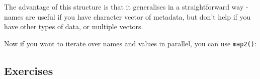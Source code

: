 \documentclass[]{book}
\newenvironment{Shaded}{\begin{snugshade}}{\end{snugshade}}
\newcommand{\KeywordTok}[1]{\textcolor[rgb]{0.13,0.29,0.53}{\textbf{{#1}}}}
\newcommand{\DataTypeTok}[1]{\textcolor[rgb]{0.13,0.29,0.53}{{#1}}}
\newcommand{\DecValTok}[1]{\textcolor[rgb]{0.00,0.00,0.81}{{#1}}}
\newcommand{\StringTok}[1]{\textcolor[rgb]{0.31,0.60,0.02}{{#1}}}
\newcommand{\CommentTok}[1]{\textcolor[rgb]{0.56,0.35,0.01}{\textit{{#1}}}}
\newcommand{\NormalTok}[1]{{#1}}
\begin{document}
The advantage of this structure is that it generalises in a
straightforward way - names are useful if you have character vector of
metadata, but don't help if you have other types of data, or multiple
vectors.

Now if you want to iterate over names and values in parallel, you can
use \texttt{map2()}:

\begin{Shaded}
\end{Shaded}

\subsection{Exercises}\label{exercises-66}
\end{document}
